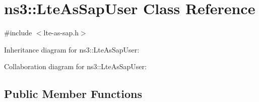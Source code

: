 \hypertarget{classns3_1_1LteAsSapUser}{}\section{ns3\+:\+:Lte\+As\+Sap\+User Class Reference}
\label{classns3_1_1LteAsSapUser}


{\ttfamily \#include $<$lte-\/as-\/sap.\+h$>$}



Inheritance diagram for ns3\+:\+:Lte\+As\+Sap\+User\+:


Collaboration diagram for ns3\+:\+:Lte\+As\+Sap\+User\+:
\subsection*{Public Member Functions}
